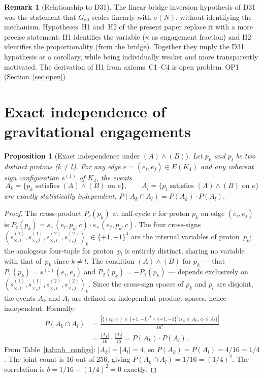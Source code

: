 \documentclass[11pt,a4paper]{article}
\newtheorem{proposition}[theorem]{Proposition}
\theoremstyle{definition}
\newtheorem{remark}[theorem]{Remark}
\newcommand{\Geff}{G_{\mathrm{eff}}}
\newcommand{\sig}{\sigma}
\newcommand{\kap}{\kappa}
\newcommand{\Kfour}{K_4}
\begin{document}
\begin{remark}[Relationship to D31]
\label{rem:D31}
The linear bridge inversion hypothesis of D31~\cite{PDL_D31_2026} was the statement that $\Geff$ scales linearly with $\sig(N)$, without identifying the mechanism. Hypotheses~H1 and~H2 of the present paper replace it with a more precise statement: H1 identifies the variable ($\kap$ as engagement fraction) and H2 identifies the proportionality (from the bridge). Together they imply the D31 hypothesis as a corollary, while being individually weaker and more transparently motivated. The derivation of H1 from axioms~C1--C4 is open problem~OP1 (Section~\ref{sec:open}).
\end{remark}

\section{Exact independence of gravitational engagements}
\label{sec:independence}

\begin{proposition}[Exact independence under $(A)\wedge(B)$]
\label{prop:independence}
Let $p_k$ and $p_l$ be two distinct protons ($k\neq l$). For any edge $e = (e_i,e_j)\in E(\Kfour)$ and any coherent sign configuration $s^{(1)}$ of $\Kfour$, the events
\begin{equation}
A_k = \{p_k \text{ satisfies } (A)\wedge(B) \text{ on } e\}, \qquad A_l = \{p_l \text{ satisfies } (A)\wedge(B) \text{ on } e\}
\label{eq:events}
\end{equation}
are exactly statistically independent: $P(A_k \cap A_l) = P(A_k)\cdot P(A_l)$.
\end{proposition}

\begin{proof}
The cross-product $P_c(p_k)$ at half-cycle $c$ for proton $p_k$ on edge $(e_i,e_j)$ is $P_c(p_k) = s_\times(e_i,p_k,c)\cdot s_\times(e_j,p_k,c)$. The four cross-signs $(s_{\times,i}^{(1)}, s_{\times,j}^{(1)}, s_{\times,i}^{(2)}, s_{\times,j}^{(2)})_k \in \{+1,-1\}^4$ are the internal variables of proton~$p_k$; the analogous four-tuple for proton~$p_l$ is entirely distinct, sharing no variable with that of~$p_k$ since $k\neq l$. The condition $(A)\wedge(B)$ for $p_k$ --- that $P_1(p_k) = s^{(1)}(e_i,e_j)$ and $P_2(p_k) = -P_1(p_k)$ --- depends exclusively on $(s_{\times,i}^{(1)}, s_{\times,j}^{(1)}, s_{\times,i}^{(2)}, s_{\times,j}^{(2)})_k$. Since the cross-sign spaces of $p_k$ and $p_l$ are disjoint, the events $A_k$ and $A_l$ are defined on independent product spaces, hence independent. Formally:
\begin{align}
P(A_k\cap A_l) &= \frac{|\{(c_k,c_l)\in\{+1,-1\}^4\times\{+1,-1\}^4 : c_k\in A_k,\, c_l\in A_l\}|}{16^2} \nonumber\\
&= \frac{|A_k|}{16}\cdot\frac{|A_l|}{16} = P(A_k)\cdot P(A_l). \label{eq:independence_proof}
\end{align}
From Table~\ref{tab:ab_configs}: $|A_k| = |A_l| = 4$, so $P(A_k) = P(A_l) = 4/16 = 1/4$. The joint count is $16$ out of $256$, giving $P(A_k\cap A_l) = 1/16 = (1/4)^2$. The correlation is $\delta = 1/16 - (1/4)^2 = 0$ exactly.
\end{proof}
\end{document}
